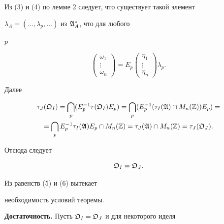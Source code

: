 Из (3) и (4) по лемме 2 следует, что существует такой элемент 


$\lambda_A=(\dotsc,\lambda_p,\dotsc)$ из $\frak A^*_A$, что для любого 


$p$ 


\begin{equation} 


\begin{pmatrix} 


\omega_1 \\ \vdots \\ \omega_n 


\end{pmatrix} 


=E_p 


\begin{pmatrix} 


\eta_1 \\ \vdots \\ \eta_n 


\end{pmatrix} 


\lambda_p. 


\end{equation} 


Далее 


\begin{multline*} 


\tau_J(\frak O_I)=\bigcap_p(E^{-1}_p\tau(\frak O_I)E_p)= 


\bigcap_p (E^{-1}_p(\tau_I(\frak A)\cap M_n(\Bbb Z))E_p)= \\ 


% 


=\bigcap_p E^{-1}_p\tau_I(\frak A)E_p\cap M_n(\Bbb Z)= 


\tau_J(\frak A)\cap M_n(\Bbb Z)=\tau_J(\frak O_J). 


\end{multline*} 


Отсюда следует


\begin{equation}


\frak O_I=\frak O_J.


\end{equation}


Из равенств (5) и (6) вытекает 


необходимость условий теоремы. 


\smallskip 


 


{\bf Достаточность.} Пусть $\frak O_I=\frak O_J$ и для некоторого иделя 


